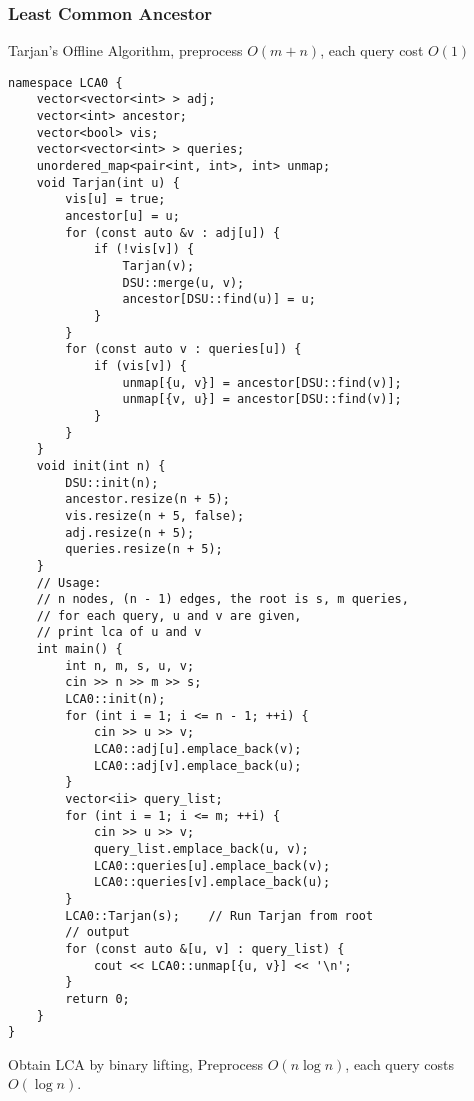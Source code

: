 \documentclass[10pt]{article}{\twocolumn}
\begin{document}
\subsubsection{Least Common Ancestor}
Tarjan's Offline Algorithm, preprocess $O(m+n)$, each query cost $O(1)$
\begin{lstlisting}
namespace LCA0 {
    vector<vector<int> > adj;
    vector<int> ancestor;
    vector<bool> vis;
    vector<vector<int> > queries;
    unordered_map<pair<int, int>, int> unmap;
    void Tarjan(int u) {
        vis[u] = true;
        ancestor[u] = u;
        for (const auto &v : adj[u]) {
            if (!vis[v]) {
                Tarjan(v);
                DSU::merge(u, v);
                ancestor[DSU::find(u)] = u;
            }
        }
        for (const auto v : queries[u]) {
            if (vis[v]) {
                unmap[{u, v}] = ancestor[DSU::find(v)];
                unmap[{v, u}] = ancestor[DSU::find(v)];
            }
        }
    }
    void init(int n) {
        DSU::init(n);
        ancestor.resize(n + 5);
        vis.resize(n + 5, false);
        adj.resize(n + 5);
        queries.resize(n + 5);
    }
    // Usage:
    // n nodes, (n - 1) edges, the root is s, m queries,
    // for each query, u and v are given, 
    // print lca of u and v
    int main() {
        int n, m, s, u, v;
        cin >> n >> m >> s;
        LCA0::init(n);
        for (int i = 1; i <= n - 1; ++i) {
            cin >> u >> v;
            LCA0::adj[u].emplace_back(v);
            LCA0::adj[v].emplace_back(u);
        }
        vector<ii> query_list;
        for (int i = 1; i <= m; ++i) {
            cin >> u >> v;
            query_list.emplace_back(u, v);
            LCA0::queries[u].emplace_back(v);
            LCA0::queries[v].emplace_back(u);
        }
        LCA0::Tarjan(s);    // Run Tarjan from root
        // output
        for (const auto &[u, v] : query_list) {
            cout << LCA0::unmap[{u, v}] << '\n';
        }
        return 0;
    }
}
\end{lstlisting}
Obtain LCA by binary lifting, Preprocess $O(n\log{n})$, each query costs $O(\log{n})$.
\end{document}
